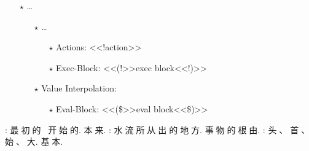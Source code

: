\begin{multicols}{2}
\begin{itemize}
\begin{itemize}
\end{itemize}
\item[$\star$] …\mktsShowpar\par
\begin{itemize}\item[$\star$] …\mktsShowpar\par
\begin{itemize}\item[$\star$] Actions: {\mktsStyleCode{}<<!action>>}\mktsShowpar\par

\item[$\star$] Exec-Block: <<(!>>exec block<<!)>>\mktsShowpar\par

\end{itemize}
\item[$\star$] Value Interpolation:
\mktsShowpar\par
\begin{itemize}\item[$\star$] Eval-Block: {\mktsStyleCode{}<<(\$>>eval block<<\$)>>}\mktsShowpar\par

\end{itemize}
\end{itemize}
\end{itemize}{}: {\cn{}最初的，开始的}. {\cn{}本来}.
{}: {\cn{}水流所从出的地方}. {\cn{}事物的根由}.
{}: {\cn{}头}{\cn{}、}{\cn{}首}{\cn{}、}{\cn{}始}{\cn{}、}{\cn{}大}. {\cn{}基本}.\mktsShowpar\par
\end{multicols}
